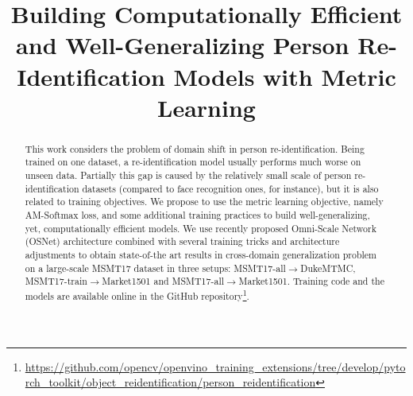 \documentclass[a4paper,conference]{IEEEtran}
\begin{document}
\title{Building Computationally Efficient and Well-Generalizing Person Re-Identification Models with Metric Learning}


\author{
\and
{}
}













\maketitle

\begin{abstract}
  This work considers the problem of domain shift in person re-identification.
  Being trained on one dataset, a re-identification model usually performs much
  worse on unseen data. Partially this gap is caused by the relatively small
  scale of person re-identification datasets (compared to face recognition ones,
  for instance), but it is also related to training objectives. We propose to
  use the metric learning objective, namely AM-Softmax loss, and some additional
  training practices to build well-generalizing, yet, computationally efficient
  models. We use recently proposed Omni-Scale Network (OSNet) architecture
  combined with several training tricks and architecture adjustments to obtain
  state-of-the art results in cross-domain generalization problem on a
  large-scale MSMT17 dataset in three setups: MSMT17-all$\rightarrow$DukeMTMC,
  MSMT17-train$\rightarrow$Market1501 and MSMT17-all$\rightarrow$Market1501. Training code
  and the models are available online in the GitHub repository\footnote{
    \url{https://github.com/opencv/openvino_training_extensions/tree/develop/pytorch_toolkit/object_reidentification/person_reidentification}}.

\end{abstract}






\IEEEpeerreviewmaketitle
\end{document}
